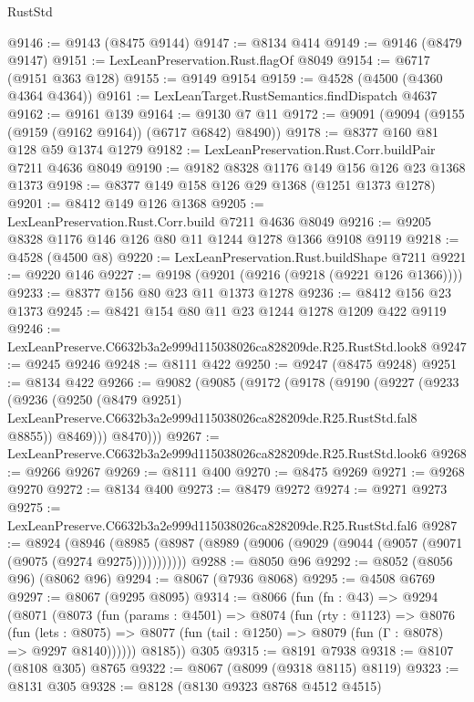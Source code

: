 \begin{lexlean}{RustStd}
\begin{coremodule}
@9146 := @9143 (@8475 @9144)
@9147 := @8134 @414
@9149 := @9146 (@8479 @9147)
@9151 := LexLeanPreservation.Rust.flagOf @8049
@9154 := @6717 (@9151 @363 @128)
@9155 := @9149 @9154
@9159 := @4528 (@4500 (@4360 @4364 @4364))
@9161 := LexLeanTarget.RustSemantics.findDispatch @4637
@9162 := @9161 @139
@9164 := @9130 @7 @11
@9172 := @9091 (@9094 (@9155 (@9159 (@9162 @9164)) (@6717 @6842) @8490))
@9178 := @8377 @160 @81 @128 @59 @1374 @1279
@9182 := LexLeanPreservation.Rust.Corr.buildPair @7211 @4636 @8049
@9190 := @9182 @8328 @1176 @149 @156 @126 @23 @1368 @1373
@9198 := @8377 @149 @158 @126 @29 @1368 (@1251 @1373 @1278)
@9201 := @8412 @149 @126 @1368
@9205 := LexLeanPreservation.Rust.Corr.build @7211 @4636 @8049
@9216 := @9205 @8328 @1176 @146 @126 @80 @11 @1244 @1278 @1366 @9108 @9119
@9218 := @4528 (@4500 @8)
@9220 := LexLeanPreservation.Rust.buildShape @7211
@9221 := @9220 @146
@9227 := @9198 (@9201 (@9216 (@9218 (@9221 @126 @1366))))
@9233 := @8377 @156 @80 @23 @11 @1373 @1278
@9236 := @8412 @156 @23 @1373
@9245 := @8421 @154 @80 @11 @23 @1244 @1278 @1209 @422 @9119
@9246 := LexLeanPreserve.C6632b3a2e999d115038026ca828209de.R25.RustStd.look8
@9247 := @9245 @9246
@9248 := @8111 @422
@9250 := @9247 (@8475 @9248)
@9251 := @8134 @422
@9266 := @9082
    (@9085
      (@9172
        (@9178
          (@9190
            (@9227
              (@9233
                (@9236
                  (@9250
                    (@8479 @9251)
                    LexLeanPreserve.C6632b3a2e999d115038026ca828209de.R25.RustStd.fal8
                    @8855))
                @8469)))
          @8470)))
@9267 := LexLeanPreserve.C6632b3a2e999d115038026ca828209de.R25.RustStd.look6
@9268 := @9266 @9267
@9269 := @8111 @400
@9270 := @8475 @9269
@9271 := @9268 @9270
@9272 := @8134 @400
@9273 := @8479 @9272
@9274 := @9271 @9273
@9275 := LexLeanPreserve.C6632b3a2e999d115038026ca828209de.R25.RustStd.fal6
@9287 := @8924
    (@8946 (@8985 (@8987 (@8989 (@9006 (@9029 (@9044 (@9057 (@9071 (@9075 (@9274 @9275)))))))))))
@9288 := @8050 @96
@9292 := @8052 (@8056 @96) (@8062 @96)
@9294 := @8067 (@7936 @8068)
@9295 := @4508 @6769
@9297 := @8067 (@9295 @8095)
@9314 := @8066
    (fun (fn : @43) =>
    @9294
      (@8071
        (@8073
          (fun (params : @4501) =>
          @8074
            (fun (rty : @1123) =>
            @8076
              (fun (lets : @8075) =>
              @8077 (fun (tail : @1250) => @8079 (fun (Γ : @8078) => @9297 @8140))))))
        @8185))
    @305
@9315 := @8191 @7938
@9318 := @8107 (@8108 @305) @8765
@9322 := @8067 (@8099 (@9318 @8115) @8119)
@9323 := @8131 @305
@9328 := @8128 (@8130 @9323 @8768 @4512 @4515)

\end{coremodule}
\end{lexlean}
